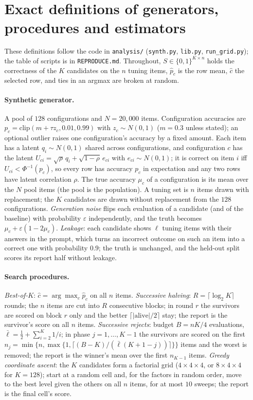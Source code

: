 \section{Exact definitions of generators, procedures and estimators}\label{app:defs}
These definitions follow the code in \texttt{analysis/} (\texttt{synth.py}, \texttt{lib.py}, \texttt{run\_grid.py}); the table of scripts is in \texttt{REPRODUCE.md}. Throughout, $S\in\{0,1\}^{K\times n}$ holds the correctness of the $K$ candidates on the $n$ tuning items, $\hat p_c$ is the row mean, $\hat c$ the selected row, and ties in an argmax are broken at random.

\paragraph{Synthetic generator.} A pool of $128$ configurations and $N=20{,}000$ items. Configuration accuracies are $p_c=\mathrm{clip}(m+\tau z_c,0.01,0.99)$ with $z_c\sim N(0,1)$ ($m=0.3$ unless stated); an optional outlier raises one configuration's accuracy by a fixed amount. Each item has a latent $q_i\sim N(0,1)$ shared across configurations, and configuration $c$ has the latent $U_{ci}=\sqrt\rho\,q_i+\sqrt{1-\rho}\,e_{ci}$ with $e_{ci}\sim N(0,1)$; it is correct on item $i$ iff $U_{ci}<\Phi^{-1}(p_c)$, so every row has accuracy $p_c$ in expectation and any two rows have latent correlation $\rho$. The true accuracy $\mu_c$ of a configuration is its mean over the $N$ pool items (the pool is the population). A tuning set is $n$ items drawn with replacement; the $K$ candidates are drawn without replacement from the $128$ configurations. \emph{Generation noise} flips each evaluation of a candidate (and of the baseline) with probability $\varepsilon$ independently, and the truth becomes $\mu_c+\varepsilon(1-2\mu_c)$. \emph{Leakage}: each candidate shows $\ell$ tuning items with their answers in the prompt, which turns an incorrect outcome on such an item into a correct one with probability $0.9$; the truth is unchanged, and the held-out split scores its report half without leakage.

\paragraph{Search procedures.} \emph{Best-of-$K$}: $\hat c=\arg\max_c\hat p_c$ on all $n$ items. \emph{Successive halving}: $R=\lceil\log_2K\rceil$ rounds; the $n$ items are cut into $R$ consecutive blocks; in round $r$ the survivors are scored on block $r$ only and the better $\lceil|\text{alive}|/2\rceil$ stay; the report is the survivor's score on all $n$ items. \emph{Successive rejects}: budget $B=nK/4$ evaluations, $\bar\ell=\tfrac12+\sum_{i=2}^{K}1/i$; in phase $j=1,\dots,K-1$ the survivors are scored on the first $n_j=\min\{n,\max\{1,\lceil (B-K)/(\bar\ell(K+1-j))\rceil\}\}$ items and the worst is removed; the report is the winner's mean over the first $n_{K-1}$ items. \emph{Greedy coordinate ascent}: the $K$ candidates form a factorial grid ($4\times4\times4$, or $8\times4\times4$ for $K=128$); start at a random cell and, for the factors in random order, move to the best level given the others on all $n$ items, for at most $10$ sweeps; the report is the final cell's score.


